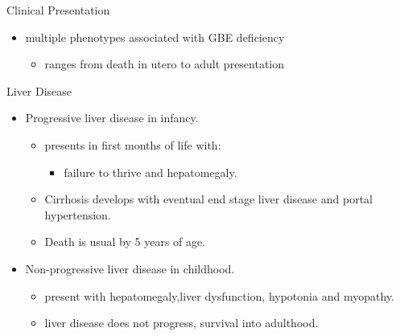 \documentclass[presentation, smaller]{beamer}
\begin{document}
\begin{frame}[label={sec:org01ac33f}]{Clinical Presentation}
\begin{itemize}
\item multiple phenotypes associated with GBE deficiency
\begin{itemize}
\item ranges from death in utero to adult presentation
\end{itemize}
\end{itemize}

\begin{block}{Liver Disease}
\begin{itemize}
\item Progressive liver disease in infancy.
\begin{itemize}
\item presents in first months of life with:
\begin{itemize}
\item failure to thrive and hepatomegaly.
\end{itemize}
\item Cirrhosis develops with eventual end stage liver disease and portal hypertension.
\item Death is usual by 5 years of age.
\end{itemize}
\item Non-progressive liver disease in childhood.
\begin{itemize}
\item present with hepatomegaly,liver dysfunction, hypotonia and
myopathy.
\item liver disease does not progress, survival into adulthood.
\end{itemize}
\end{itemize}
\end{block}
\end{frame}
\end{document}
